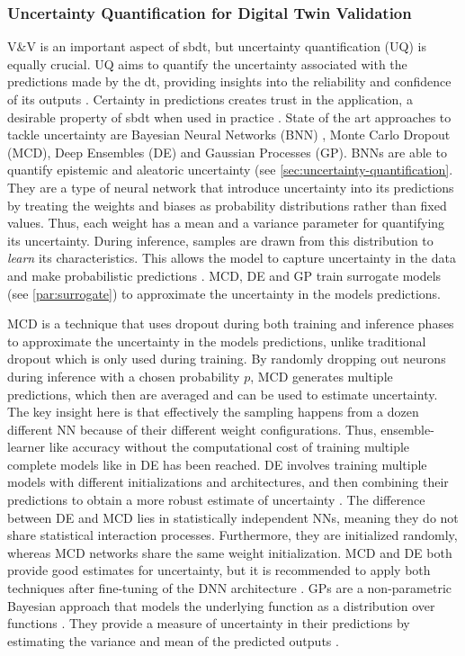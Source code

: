 \subsubsection*{Uncertainty Quantification for Digital Twin Validation}
\label{sec:uq-dt}
V\&V is an important aspect of \gls{sbdt}, but uncertainty quantification (UQ) is equally crucial. UQ aims to quantify the uncertainty associated with the predictions made by the \gls{dt}, providing insights into the reliability and confidence of its outputs \autocite{sel2025survey}. Certainty in predictions creates trust in the application, a desirable property of \gls{sbdt} when used in practice \autocite{dwivedi2023explainable}. State of the art approaches to tackle uncertainty are Bayesian Neural Networks (BNN) \autocite{li2017dynamic}, Monte Carlo Dropout (MCD), Deep Ensembles (DE) and Gaussian Processes (GP). BNNs are able to quantify epistemic and aleatoric uncertainty (see \autoref{sec:uncertainty-quantification}. They are a type of neural network that introduce uncertainty into its predictions by treating the weights and biases as probability distributions rather than fixed values. Thus, each weight has a mean and a variance parameter for quantifying its uncertainty. During inference, samples are drawn from this distribution to \textit{learn} its characteristics. This allows the model to capture uncertainty in the data and make probabilistic predictions \autocite{li2017dynamic}. MCD, DE and GP train surrogate models (see \autoref{par:surrogate}) to approximate the uncertainty in the models predictions.

MCD is a technique that uses dropout \autocite{srivastava2014dropout} during both training and inference phases to approximate the uncertainty in the models predictions, unlike traditional dropout which is only used during training. By randomly dropping out neurons during inference with a chosen probability $p$, MCD generates multiple predictions, which then are averaged and can be used to estimate uncertainty. The key insight here is that effectively the sampling happens from a dozen different NN because of their different weight configurations. Thus, ensemble-learner like accuracy without the computational cost of training multiple complete models like in DE has been reached.
DE involves training multiple models with different initializations and architectures, and then combining their predictions to obtain a more robust estimate of uncertainty \autocite{rahaman2021uncertainty}. The difference between DE and MCD lies in statistically independent NNs, meaning they do not share statistical interaction processes. Furthermore, they are initialized randomly, whereas MCD networks share the same weight initialization. MCD and DE both provide good estimates for uncertainty, but it is recommended to apply both techniques after fine-tuning of the DNN architecture \autocite{kamali2024advancements}.
GPs are a non-parametric Bayesian approach that models the underlying function as a distribution over functions \autocite{bilionis2012multi}. They provide a measure of uncertainty in their predictions by estimating the variance and mean of the predicted outputs \autocite{Burr2025TEADT}.


